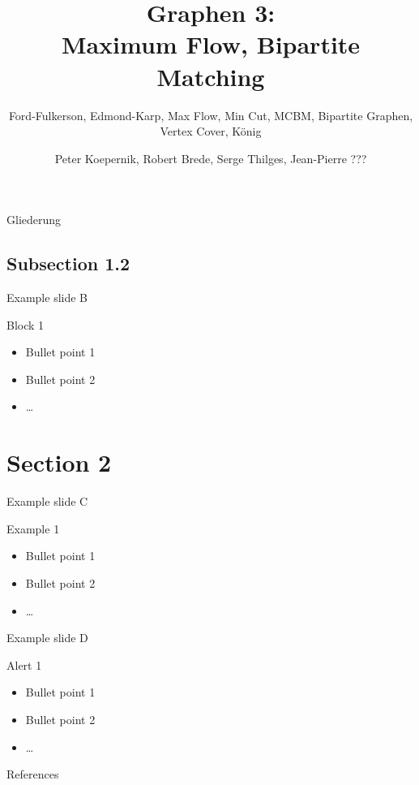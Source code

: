 \documentclass[18pt]{beamer}
\title[Graphen III]{Graphen 3:\\ Maximum Flow, Bipartite Matching}
\subtitle{Ford-Fulkerson, Edmond-Karp, Max Flow, Min Cut, MCBM, Bipartite Graphen, Vertex Cover, König}
\author{Peter Koepernik, Robert Brede, Serge Thilges, Jean-Pierre ???}
\institute{Basispraktikum zum ICPC Programmierwettbewerb}
\begin{document}

\begin{frame}
\titlepage
\end{frame}

\begin{frame}{Gliederung}
\tableofcontents
\end{frame}






\subsection{Subsection 1.2}
\begin{frame}{Example slide B}
\begin{block}{Block 1}
\begin{itemize}
\item Bullet point 1
\pause
\item Bullet point 2
\item \dots
\end{itemize}
\end{block}
\end{frame}

\section{Section 2}
\begin{frame}{Example slide C}
\begin{exampleblock}{Example 1}
\begin{itemize}
\item Bullet point 1
\pause
\item Bullet point 2
\item \dots
\end{itemize}
\end{exampleblock}
\end{frame}

\begin{frame}{Example slide D}
\begin{alertblock}{Alert 1}
\begin{itemize}
\item Bullet point 1
\pause
\item Bullet point 2
\item \dots
\end{itemize}
\end{alertblock}
\end{frame}

\appendix
\beginbackup

\begin{frame}[allowframebreaks]{References}
\printbibliography
\end{frame}

\backupend
\end{document}
